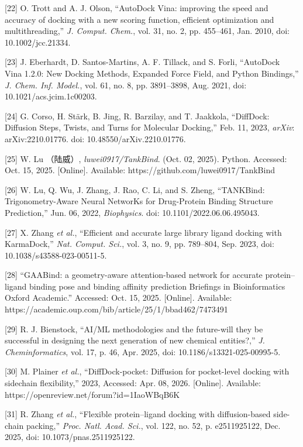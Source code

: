 {[}22{]} O. Trott and A. J. Olson, ``AutoDock Vina: improving the speed and accuracy of docking with a new scoring function, efficient optimization and multithreading,'' \emph{J. Comput. Chem.}, vol. 31, no. 2, pp. 455--461, Jan. 2010, doi: 10.1002/jcc.21334.

{[}23{]} J. Eberhardt, D. Santos-Martins, A. F. Tillack, and S. Forli, ``AutoDock Vina 1.2.0: New Docking Methods, Expanded Force Field, and Python Bindings,'' \emph{J. Chem. Inf. Model.}, vol. 61, no. 8, pp. 3891--3898, Aug. 2021, doi: 10.1021/acs.jcim.1c00203.

{[}24{]} G. Corso, H. Stärk, B. Jing, R. Barzilay, and T. Jaakkola, ``DiffDock: Diffusion Steps, Twists, and Turns for Molecular Docking,'' Feb. 11, 2023, \emph{arXiv}: arXiv:2210.01776. doi: 10.48550/arXiv.2210.01776.

{[}25{]} W. Lu （陆威）, \emph{luwei0917/TankBind}. (Oct. 02, 2025). Python. Accessed: Oct. 15, 2025. {[}Online{]}. Available: https://github.com/luwei0917/TankBind

{[}26{]} W. Lu, Q. Wu, J. Zhang, J. Rao, C. Li, and S. Zheng, ``TANKBind: Trigonometry-Aware Neural NetworKs for Drug-Protein Binding Structure Prediction,'' Jun. 06, 2022, \emph{Biophysics}. doi: 10.1101/2022.06.06.495043.

{[}27{]} X. Zhang \emph{et al.}, ``Efficient and accurate large library ligand docking with KarmaDock,'' \emph{Nat. Comput. Sci.}, vol. 3, no. 9, pp. 789--804, Sep. 2023, doi: 10.1038/s43588-023-00511-5.

{[}28{]} ``GAABind: a geometry-aware attention-based network for accurate protein--ligand binding pose and binding affinity prediction \textbar{} Briefings in Bioinformatics \textbar{} Oxford Academic.'' Accessed: Oct. 15, 2025. {[}Online{]}. Available: https://academic.oup.com/bib/article/25/1/bbad462/7473491

{[}29{]} R. J. Bienstock, ``AI/ML methodologies and the future-will they be successful in designing the next generation of new chemical entities?,'' \emph{J. Cheminformatics}, vol. 17, p. 46, Apr. 2025, doi: 10.1186/s13321-025-00995-5.

{[}30{]} M. Plainer \emph{et al.}, ``DiffDock-pocket: Diffusion for pocket-level docking with sidechain flexibility,'' 2023, Accessed: Apr. 08, 2026. {[}Online{]}. Available: https://openreview.net/forum?id=1IaoWBqB6K

{[}31{]} R. Zhang \emph{et al.}, ``Flexible protein--ligand docking with diffusion-based side-chain packing,'' \emph{Proc. Natl. Acad. Sci.}, vol. 122, no. 52, p. e2511925122, Dec. 2025, doi: 10.1073/pnas.2511925122.


